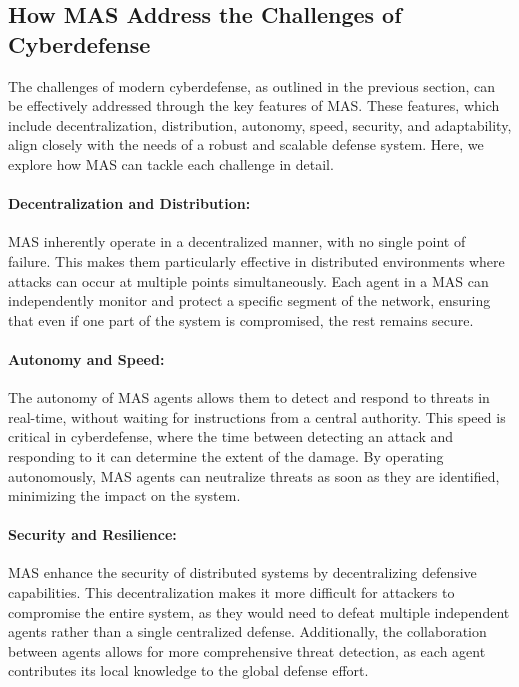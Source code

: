 \subsection{How MAS Address the Challenges of Cyberdefense}

The challenges of modern cyberdefense, as outlined in the previous section, can be effectively addressed through the key features of MAS. These features, which include decentralization, distribution, autonomy, speed, security, and adaptability, align closely with the needs of a robust and scalable defense system. Here, we explore how MAS can tackle each challenge in detail.

\paragraph{Decentralization and Distribution:}
MAS inherently operate in a decentralized manner, with no single point of failure. This makes them particularly effective in distributed environments where attacks can occur at multiple points simultaneously. Each agent in a MAS can independently monitor and protect a specific segment of the network, ensuring that even if one part of the system is compromised, the rest remains secure.

\paragraph{Autonomy and Speed:}
The autonomy of MAS agents allows them to detect and respond to threats in real-time, without waiting for instructions from a central authority. This speed is critical in cyberdefense, where the time between detecting an attack and responding to it can determine the extent of the damage. By operating autonomously, MAS agents can neutralize threats as soon as they are identified, minimizing the impact on the system.

\paragraph{Security and Resilience:}
MAS enhance the security of distributed systems by decentralizing defensive capabilities. This decentralization makes it more difficult for attackers to compromise the entire system, as they would need to defeat multiple independent agents rather than a single centralized defense. Additionally, the collaboration between agents allows for more comprehensive threat detection, as each agent contributes its local knowledge to the global defense effort.

